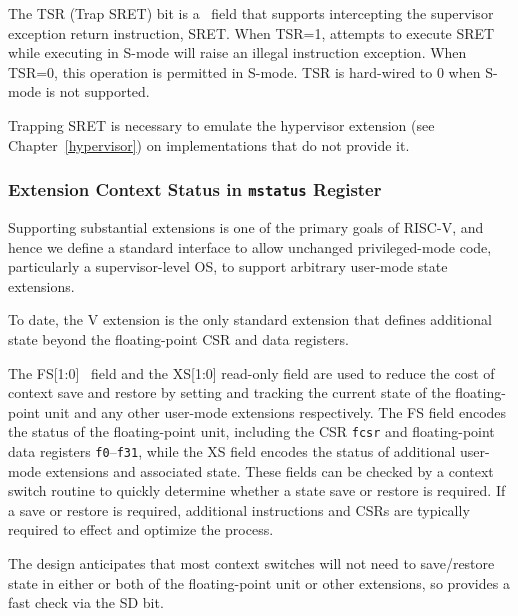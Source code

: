 The TSR (Trap SRET) bit is a \warl\ field that
supports intercepting the supervisor exception return
instruction, SRET.  When TSR=1, attempts to execute SRET while executing in
S-mode will raise an illegal instruction exception.  When TSR=0, this
operation is permitted in S-mode.  TSR is hard-wired to 0 when S-mode is not
supported.

\begin{commentary}
Trapping SRET is necessary to emulate the hypervisor extension
(see Chapter~\ref{hypervisor}) on implementations that do not provide it.
\end{commentary}

\subsubsection{Extension Context Status in {\tt mstatus} Register}

Supporting substantial extensions is one of the primary goals of
RISC-V, and hence we define a standard interface to allow unchanged
privileged-mode code, particularly a supervisor-level OS, to support
arbitrary user-mode state extensions.

\begin{commentary}
  To date, the V extension is the only standard extension that defines
  additional state beyond the floating-point CSR and data registers.
\end{commentary}

The FS[1:0] \warl\ field and the XS[1:0] read-only field are used
to reduce the cost of context save and restore by setting and tracking
the current state of the floating-point unit and any other user-mode
extensions respectively.  The FS field encodes the status of the
floating-point unit, including the CSR {\tt fcsr} and floating-point
data registers {\tt f0}--{\tt f31}, while the XS field encodes the
status of additional user-mode extensions and associated state.
These fields can be checked by a context switch routine to quickly
determine whether a state save or restore is required.  If a save or
restore is required, additional instructions and CSRs are typically
required to effect and optimize the process.

\begin{commentary}
  The design anticipates that most context switches will not need to
  save/restore state in either or both of the floating-point unit or
  other extensions, so provides a fast check via the SD bit.
\end{commentary}


